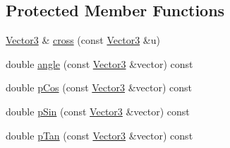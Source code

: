 \subsection*{Protected Member Functions}
\begin{DoxyCompactItemize}
\item 
\mbox{\hyperlink{class_vector3}{Vector3}} \& \mbox{\hyperlink{class_vector3_ab4221b101df67f562347dde6738c66fc}{cross}} (const \mbox{\hyperlink{class_vector3}{Vector3}} \&u)
\item 
double \mbox{\hyperlink{class_vector3_a4ec864436ebac499950f4c06091688db}{angle}} (const \mbox{\hyperlink{class_vector3}{Vector3}} \&vector) const
\item 
double \mbox{\hyperlink{class_vector3_a98422ceb8200829cea11bdeb6417daba}{p\+Cos}} (const \mbox{\hyperlink{class_vector3}{Vector3}} \&vector) const
\item 
double \mbox{\hyperlink{class_vector3_a38053a75ccb2f7415fff046609c52e31}{p\+Sin}} (const \mbox{\hyperlink{class_vector3}{Vector3}} \&vector) const
\item 
double \mbox{\hyperlink{class_vector3_aef71e3e404dd8183e3bd5ed901e91444}{p\+Tan}} (const \mbox{\hyperlink{class_vector3}{Vector3}} \&vector) const
\end{DoxyCompactItemize}
